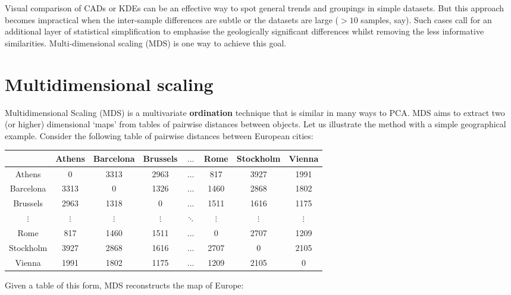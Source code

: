 \begin{refsection}
Visual comparison of CADs or KDEs can be an effective way to spot
general trends and groupings in simple datasets. But this approach
becomes impractical when the inter-sample differences are subtle or
the datasets are large ($>10$ samples, say). Such cases call for an
additional layer of statistical simplification to emphasise the
geologically significant differences whilst removing the less
informative similarities. Multi-dimensional scaling (MDS) is one way
to achieve this goal.

\section{Multidimensional scaling}\label{sec:MDS}

Multidimensional Scaling (MDS) is a multivariate \textbf{ordination}
technique that is similar in many ways to PCA. MDS aims to extract two
(or higher) dimensional `maps' from tables of pairwise distances
between objects. Let us illustrate the method with a simple
geographical example. Consider the following table of pairwise
distances between European cities:

\begin{center}
  \begin{tabular}{c|ccccccc}
  &  Athens & Barcelona & Brussels & $\ldots$ & Rome & Stockholm & Vienna \\ \hline
Athens & 0 & 3313 & 2963 & $\ldots$ & 817 & 3927 & 1991 \\
Barcelona & 3313 & 0 & 1326 & $\ldots$ & 1460 & 2868 & 1802 \\
Brussels & 2963 & 1318 & 0 & $\ldots$ & 1511 & 1616 & 1175 \\
$\vdots$ & $\vdots$ & $\vdots$ & $\vdots$ & $\ddots$ &
$\vdots$  & $\vdots$ & $\vdots$ \\
Rome & 817 & 1460 & 1511 & $\ldots$ & 0 & 2707 & 1209 \\
Stockholm & 3927 & 2868 & 1616 & $\ldots$ & 2707 & 0 & 2105 \\
Vienna & 1991 & 1802 & 1175 & $\ldots$ & 1209 & 2105 & 0 
  \end{tabular}
  \label{tab:eurodist}
\end{center}

Given a table of this form, MDS reconstructs the map of Europe:


\end{refsection}
